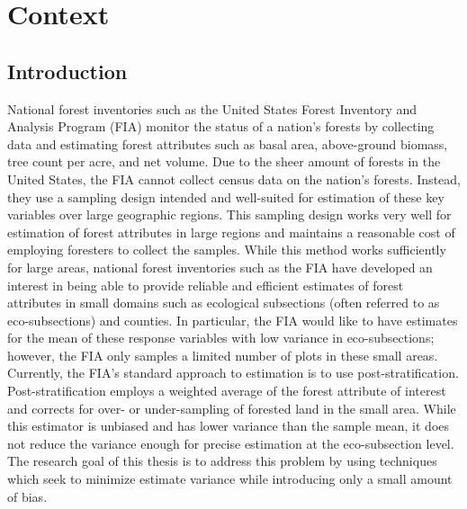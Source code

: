 \documentclass[12pt,twoside]{reedthesis}
\begin{document}
\hypertarget{context}{%
\chapter{Context}\label{context}}

\hypertarget{introduction}{%
\section{Introduction}\label{introduction}}

National forest inventories such as the United States Forest Inventory and Analysis Program (FIA) monitor the status of a nation's forests by collecting data and estimating forest attributes such as basal area, above-ground biomass, tree count per acre, and net volume. Due to the sheer amount of forests in the United States, the FIA cannot collect census data on the nation's forests. Instead, they use a sampling design intended and well-suited for estimation of these key variables over large geographic regions. This sampling design works very well for estimation of forest attributes in large regions and maintains a reasonable cost of employing foresters to collect the samples. While this method works sufficiently for large areas, national forest inventories such as the FIA have developed an interest in being able to provide reliable and efficient estimates of forest attributes in small domains such as ecological subsections (often referred to as eco-subsections) and counties. In particular, the FIA would like to have estimates for the mean of these response variables with low variance in eco-subsections; however, the FIA only samples a limited number of plots in these small areas. Currently, the FIA's standard approach to estimation is to use post-stratification. Post-stratification employs a weighted average of the forest attribute of interest and corrects for over- or under-sampling of forested land in the small area. While this estimator is unbiased and has lower variance than the sample mean, it does not reduce the variance enough for precise estimation at the eco-subsection level. The research goal of this thesis is to address this problem by using techniques which seek to minimize estimate variance while introducing only a small amount of bias.
\end{document}
